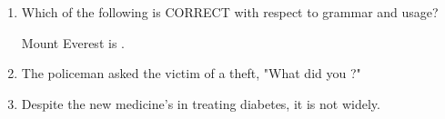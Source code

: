 \documentclass[journal,11pt,onecolumn]{IEEEtran}
\begin{document}
\begin{enumerate}

    \item Which of the following is CORRECT with respect to grammar and usage?

          Mount Everest is \underline{\hspace{2cm}}.

          \begin{enumerate}


          \end{enumerate}

    \item The policeman asked the victim of a theft, "What did you \underline{\hspace{2cm}}?"

          \begin{enumerate}


          \end{enumerate}

    \item Despite the new medicine's \underline{\hspace{2cm}} in treating diabetes, it is not \underline{\hspace{2cm}}widely.


\end{enumerate}
\end{document}
